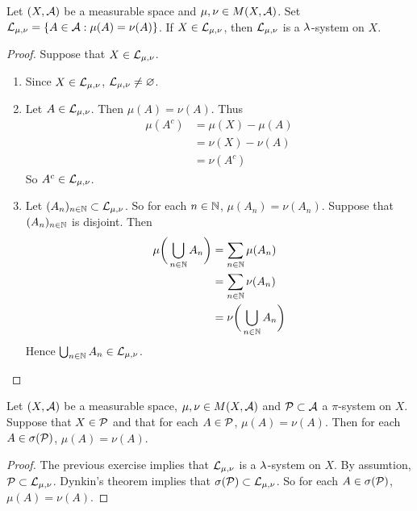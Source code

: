 \documentclass{book}
\begin{document}
	\begin{ex}  
		Let $(X, \mathcal{A})$ be a measurable space and $\mu, \nu \in M(X, \mathcal{A})$. Set $\mathcal{L}_{\mu,\nu} = \{A \in \mathcal{A}: \mu(A) = \nu(A)\}$. If $X \in \mathcal{L}_{\mu, \nu}$, then $\mathcal{L}_{\mu, \nu}$ is a $\lambda$-system on $X$.
	\end{ex}
	
	\begin{proof} Suppose that  $X \in \mathcal{L}_{\mu, \nu}$.
		\begin{enumerate}
			\item Since $X \in \mathcal{L}_{\mu, \nu}$, $\mathcal{L}_{\mu, \nu} \neq \varnothing$.
			\item Let $A \in \mathcal{L}_{\mu, \nu}$. Then $\mu(A) = \nu(A)$. Thus 
			\begin{align*}
				\mu(A^c) 
				&= \mu(X)-\mu(A) \\
				&= \nu(X) -\nu(A) \\
				&= \nu(A^c)
			\end{align*}
			So $A^c \in \mathcal{L}_{\mu, \nu}$. 
			\item Let $(A_n)_{n \in \mathbb{N}} \subset \mathcal{L}_{\mu, \nu}$. So for each $n \in \mathbb{N}$, $\mu(A_n) = \nu(A_n)$.  Suppose that $(A_n)_{n \in \mathbb{N}}$ is disjoint. Then 
			\begin{align*}
				\mu\bigg(\bigcup_{n \in \mathbb{N}} A_n\bigg) 
				&= \sum_{n \in \mathbb{N}} \mu(A_n) \\
				&= \sum_{n \in \mathbb{N}} \nu(A_n) \\
				&= \nu\bigg(\bigcup_{n \in \mathbb{N}} A_n\bigg) 
			\end{align*}
			Hence $\bigcup_{n \in \mathbb{N}} A_n \in \mathcal{L}_{\mu, \nu}$.
		\end{enumerate}
	\end{proof}
	
	\begin{ex}  
		Let $(X, \mathcal{A})$ be a measurable space, $\mu, \nu \in M(X, \mathcal{A})$ and $\mathcal{P} \subset \mathcal{A}$ a $\pi$-system on $X$. Suppose that $X \in \mathcal{P}$ and that for each $A \in \mathcal{P}$, $\mu(A) = \nu(A)$. Then for each $A \in \sigma(\mathcal{P})$, $\mu(A) = \nu(A)$.
	\end{ex}
	
	\begin{proof}
		The previous exercise implies that $\mathcal{L}_{\mu, \nu}$ is a $\lambda$-system on $X$. By assumtion, $\mathcal{P} \subset \mathcal{L}_{\mu, \nu}$. Dynkin's theorem implies that $\sigma(\mathcal{P}) \subset \mathcal{L}_{\mu, \nu}$. So for each $A \in \sigma(\mathcal{P})$, $\mu(A) = \nu(A)$.
	\end{proof}
\end{document}
